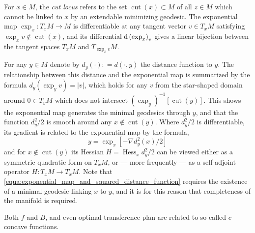 For \( x \in M \), the \emph{cut locus} refers to the set \( \operatorname{cut}( x ) \subset M \) of all \( z \in M \) which
cannot be linked to \( x \) by an extendable minimizing geodesic.
The exponential map \( \exp _ { x } : T _ { x } M \rightarrow M \) is differentiable
at any tangent vector \( v \in T _ { x } M \) satisfying \( \exp _ { x } v \notin \operatorname{cut}( x )\),
and its differential \( \operatorname{d} \left( \exp _ { x } \right) _ { v } \) gives a linear bijection between the tangent
spaces \( T _ { x } M \) and \( T _ { \exp _ { x } v} M\).

For any \( y \in M \) denote by \( d _ { y } ( \cdot ) : = d ( \cdot , y ) \)
the distance function to \( y \).
The relationship between this distance and the
exponential map is summarized by the formula \( d _ { y } \left( \exp _ { y } v \right) = | v | \),
which holds for any \( v \) from the star-shaped domain around \( 0 \in T _ { y } M \)
which does not intersect \( \left( \exp _ { y } \right) ^ { - 1 } [ \operatorname{cut} ( y ) ]\).
This shows the exponential map generates the minimal geodesics through \( y \),
and that the function \( d _ { y } ^ { 2 } / 2 \) is smooth around any \( x \notin \operatorname{cut} ( y ) \).
Where \( d _ { y } ^ { 2 } / 2 \) is differentiable,
its gradient is related to the exponential map by the formula,
\begin{equation}
	\label{equa:exponential_map_and_squared_distance_function}
	y = \exp _ { x } \left[ - \nabla d _ { y } ^ { 2 } ( x ) / 2 \right]
\end{equation}
and for \( x \notin \operatorname { cut } ( y ) \) its Hessian \( H = \operatorname{ Hess} _ { x } d _ { y } ^ { 2 } / 2 \) can be viewed either as a symmetric quadratic form on \( T _ { x } M \),
or --- more frequently --- as a self-adjoint operator
\( H : T _ { x } M \rightarrow T _ { x } M \).
Note that \cref{equa:exponential_map_and_squared_distance_function} requires the existence of
a minimal geodesic linking \( x \) to \( y \),
and it is for this reason that completeness of the manifold is required.


Both $f$ and $B$, and even optimal transference plan are related to so-called $c$-concave functions.

